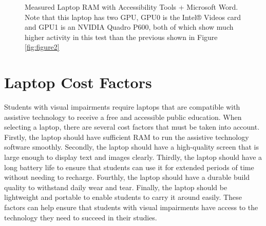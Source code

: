 \begin{figure}[H]
\hfill
{}
\caption[Measured Laptop RAM with Accessibility Tools + Microsoft Word]{Measured Laptop RAM with Accessibility Tools + Microsoft Word. Note that this laptop has two GPU, GPU0 is the Intel® Videos card and GPU1 is an NVIDIA Quadro P600, both of which show much higher activity in this test than the previous shown in Figure \ref{fig:figure2}}
\label{fig:figure3}
\end{figure}

\pagebreak \hypertarget{notes-on-future-proofing-laptops}{}\section{Laptop Cost Factors}\label{notes-on-future-proofing-laptops}
Students with visual impairments require laptops that are compatible with assistive technology to receive a free and accessible public education. When selecting a laptop, there are several cost factors that must be taken into account. Firstly, the laptop should have sufficient RAM to run the assistive technology software smoothly. Secondly, the laptop should have a high-quality screen that is large enough to display text and images clearly. Thirdly, the laptop should have a long battery life to ensure that students can use it for extended periods of time without needing to recharge. Fourthly, the laptop should have a durable build quality to withstand daily wear and tear. Finally, the laptop should be lightweight and portable to enable students to carry it around easily. These factors can help ensure that students with visual impairments have access to the technology they need to succeed in their studies.

